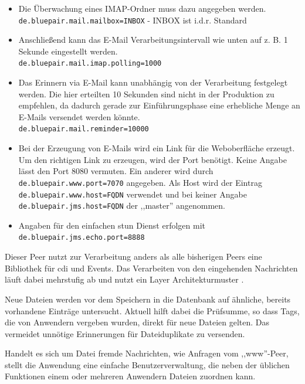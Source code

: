 \documentclass[oneside, ngerman, toc=bibliography,bibliography=totoc,listof=entryprefix, open=right,numbers=noenddot,fontsize=12pt]{scrbook}
\begin{document}
\begin{itemize}
    \item Die Überwachung eines IMAP-Ordner muss dazu angegeben werden.\\
    \verb|de.bluepair.mail.mailbox=INBOX| - INBOX ist i.d.r. Standard
    \item Anschließend kann das E-Mail Verarbeitungsintervall wie unten auf z. B. 1 Sekunde eingestellt werden.\\
    \verb|de.bluepair.mail.imap.polling=1000|
    \item Das Erinnern via E-Mail kann unabhängig von der Verarbeitung festgelegt werden. Die hier erteilten 10 Sekunden sind nicht in der Produktion zu empfehlen, da dadurch gerade zur Einführungsphase eine erhebliche Menge an E-Mails versendet werden könnte.\\
    \verb|de.bluepair.mail.reminder=10000|
    \item Bei der Erzeugung von E-Mails wird ein Link für die Weboberfläche erzeugt. Um den richtigen Link zu erzeugen, wird der Port benötigt. Keine Angabe lässt den Port 8080 vermuten. Ein anderer wird durch \\
    \verb|de.bluepair.www.port=7070| angegeben. Als Host wird der Eintrag \\
    \verb|de.bluepair.www.host=FQDN| verwendet und bei keiner Angabe \\
     \verb|de.bluepair.jms.host=FQDN| der ,,master'' angenommen.
    
    \item Angaben für den einfachen \acrshort{stun} Dienst erfolgen mit \\
    \verb|de.bluepair.jms.echo.port=8888|
    
\end{itemize}
 
Dieser Peer nutzt zur Verarbeitung anders als alle bisherigen Peers eine Bibliothek für \acrshort{cdi} und Events. 
Das Verarbeiten von den eingehenden Nachrichten läuft dabei mehrstufig ab und nutzt ein Layer Architekturmuster \cite{buschmann1998pattern}.

Neue Dateien werden vor dem Speichern in die Datenbank auf ähnliche, bereits vorhandene Einträge untersucht.
Aktuell hilft dabei die Prüfsumme, so dass Tags, die von Anwendern vergeben wurden, direkt für neue Dateien gelten. Das vermeidet unnötige Erinnerungen für Dateiduplikate  zu versenden.

Handelt es sich um Datei fremde Nachrichten, wie Anfragen vom ,,www''-Peer, stellt die Anwendung eine einfache Benutzerverwaltung, die neben der üblichen Funktionen  einem oder mehreren Anwendern Dateien zuordnen kann.
\end{document}
